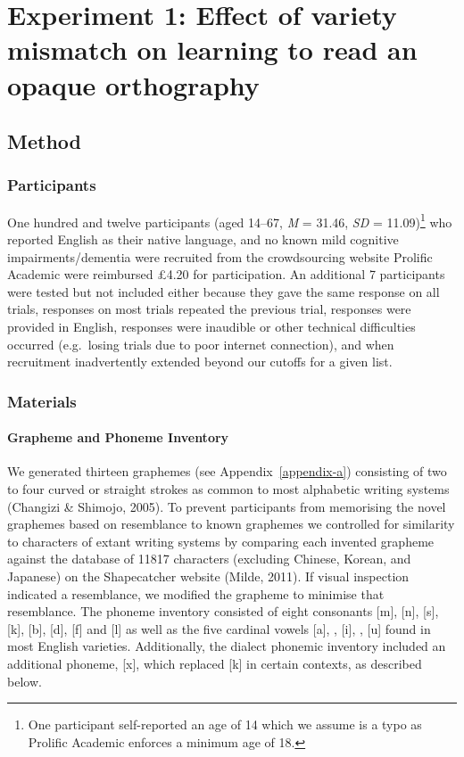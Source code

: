 \documentclass[doc,floatsintext]{apa6}
\let\oldparagraph\paragraph
\renewcommand{\paragraph}[1]{\oldparagraph{#1}\mbox{}}
\let\rmarkdownfootnote\footnote%
\def\footnote{\protect\rmarkdownfootnote}
\begin{document}
\section{Experiment 1: Effect of variety mismatch on learning to read an
opaque
orthography}\label{experiment-1-effect-of-variety-mismatch-on-learning-to-read-an-opaque-orthography}

\subsection{Method}\label{method}

\subsubsection{Participants}\label{participants}

One hundred and twelve participants (aged 14--67, \emph{M} = 31.46,
\emph{SD} = 11.09)\footnote{One participant self-reported an age of 14
  which we assume is a typo as Prolific Academic enforces a minimum age
  of 18.} who reported English as their native language, and no known
mild cognitive impairments/dementia were recruited from the
crowdsourcing website Prolific Academic were reimbursed \pounds 4.20 for
participation. An additional 7 participants were tested but not included
either because they gave the same response on all trials, responses on
most trials repeated the previous trial, responses were provided in
English, responses were inaudible or other technical difficulties
occurred (e.g.~losing trials due to poor internet connection), and when
recruitment inadvertently extended beyond our cutoffs for a given list.

\subsubsection{Materials}\label{materials}

\paragraph{Grapheme and Phoneme
Inventory}\label{grapheme-and-phoneme-inventory}

We generated thirteen graphemes (see Appendix~\ref{appendix-a})
consisting of two to four curved or straight strokes as common to most
alphabetic writing systems (Changizi \& Shimojo, 2005). To prevent
participants from memorising the novel graphemes based on resemblance to
known graphemes we controlled for similarity to characters of extant
writing systems by comparing each invented grapheme against the database
of 11817 characters (excluding Chinese, Korean, and Japanese) on the
Shapecatcher website (Milde, 2011). If visual inspection indicated a
resemblance, we modified the grapheme to minimise that resemblance. The
phoneme inventory consisted of eight consonants {[}m{]}, {[}n{]},
{[}s{]}, {[}k{]}, {[}b{]}, {[}d{]}, {[}f{]} and {[}l{]} as well as the
five cardinal vowels {[}a{]}, \textipa{[E]}, {[}i{]}, \textipa{[O]},
{[}u{]} found in most English varieties. Additionally, the dialect
phonemic inventory included an additional phoneme, {[}x{]}, which
replaced {[}k{]} in certain contexts, as described below.
\end{document}
